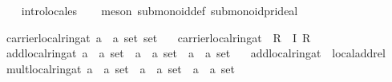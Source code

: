 \documentclass[12pt]{scrartcl}
\begin{document}
\begin{isabelle}
\ \ \isamarkupfalse%
\ intro{\isacharunderscore}{\kern0pt}locales\isanewline
\ \ \isamarkupfalse%
\ {\isacharparenleft}{\kern0pt}meson\ submonoid{\isacharunderscore}{\kern0pt}def\ submonoid{\isacharunderscore}{\kern0pt}pr{\isacharunderscore}{\kern0pt}ideal{\isacharparenright}{\kern0pt}%

\isanewline
{}\isamarkupfalse%
\ carrier{\isacharunderscore}{\kern0pt}local{\isacharunderscore}{\kern0pt}ring{\isacharunderscore}{\kern0pt}at{\isacharcolon}{\kern0pt}{\isacharcolon}{\kern0pt}\ {\isachardoublequoteopen}{\isacharparenleft}{\kern0pt}{\isacharprime}{\kern0pt}a\ {\isasymtimes}\ {\isacharprime}{\kern0pt}a{\isacharparenright}{\kern0pt}\ set\ set{\isachardoublequoteclose}\isanewline
\ \ \ {\isachardoublequoteopen}carrier{\isacharunderscore}{\kern0pt}local{\isacharunderscore}{\kern0pt}ring{\isacharunderscore}{\kern0pt}at\ {\isasymequiv}\ {\isacharparenleft}{\kern0pt}R\ {\isasymsetminus}\ I{\isacharparenright}{\kern0pt}\isactrlsup {\isasyminverse}\ R\isactrlbsub {\isacharparenleft}{\kern0pt}{\isacharplus}{\kern0pt}{\isacharparenright}{\kern0pt}\ {\isacharparenleft}{\kern0pt}{\isasymcdot}{\isacharparenright}{\kern0pt}\ {\isasymzero}\isactrlesub {\isachardoublequoteclose}\isanewline
\isanewline
{}\isamarkupfalse%
\ add{\isacharunderscore}{\kern0pt}local{\isacharunderscore}{\kern0pt}ring{\isacharunderscore}{\kern0pt}at{\isacharcolon}{\kern0pt}{\isacharcolon}{\kern0pt}\ {\isachardoublequoteopen}{\isacharparenleft}{\kern0pt}{\isacharprime}{\kern0pt}a\ {\isasymtimes}\ {\isacharprime}{\kern0pt}a{\isacharparenright}{\kern0pt}\ set\ {\isasymRightarrow}\ {\isacharparenleft}{\kern0pt}{\isacharprime}{\kern0pt}a\ {\isasymtimes}\ {\isacharprime}{\kern0pt}a{\isacharparenright}{\kern0pt}\ set\ {\isasymRightarrow}\ {\isacharparenleft}{\kern0pt}{\isacharprime}{\kern0pt}a\ {\isasymtimes}\ {\isacharprime}{\kern0pt}a{\isacharparenright}{\kern0pt}\ set{\isachardoublequoteclose}\isanewline
\ \ \ {\isachardoublequoteopen}add{\isacharunderscore}{\kern0pt}local{\isacharunderscore}{\kern0pt}ring{\isacharunderscore}{\kern0pt}at\ {\isasymequiv}\ local{\isachardot}{\kern0pt}add{\isacharunderscore}{\kern0pt}rel\ {\isachardoublequoteclose}\isanewline
\isanewline
{}\isamarkupfalse%
\ mult{\isacharunderscore}{\kern0pt}local{\isacharunderscore}{\kern0pt}ring{\isacharunderscore}{\kern0pt}at{\isacharcolon}{\kern0pt}{\isacharcolon}{\kern0pt}\ {\isachardoublequoteopen}{\isacharparenleft}{\kern0pt}{\isacharprime}{\kern0pt}a\ {\isasymtimes}\ {\isacharprime}{\kern0pt}a{\isacharparenright}{\kern0pt}\ set\ {\isasymRightarrow}\ {\isacharparenleft}{\kern0pt}{\isacharprime}{\kern0pt}a\ {\isasymtimes}\ {\isacharprime}{\kern0pt}a{\isacharparenright}{\kern0pt}\ set\ {\isasymRightarrow}\ {\isacharparenleft}{\kern0pt}{\isacharprime}{\kern0pt}a\ {\isasymtimes}\ {\isacharprime}{\kern0pt}a{\isacharparenright}{\kern0pt}\ set{\isachardoublequoteclose}\isanewline

\end{isabelle}
\end{document}
